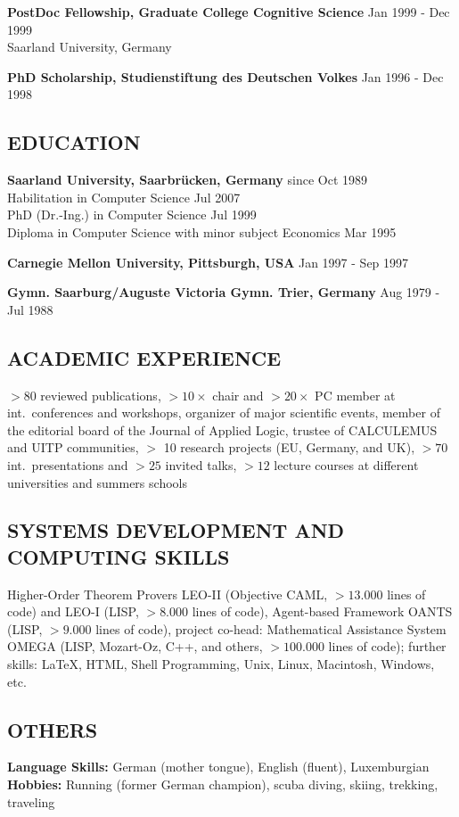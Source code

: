 \documentclass{article}
\newcommand{\tmtextbf}[1]{{\bfseries{#1}}}
\begin{document}
{\noindent}\tmtextbf{PostDoc Fellowship, Graduate College Cognitive Science}
{\hspace*{\fill}}Jan 1999 - Dec 1999\\
Saarland University, Germany

{\noindent}\tmtextbf{PhD Scholarship, Studienstiftung des Deutschen Volkes}
{\hspace*{\fill}}Jan 1996 - Dec 1998

\subsection*{EDUCATION}{\noindent}\tmtextbf{Saarland University,
Saarbr\"ucken, Germany} {\hspace*{\fill}}since Oct 1989\\
Habilitation in Computer Science {\hspace*{\fill}}Jul 2007\\
PhD (Dr.-Ing.) in Computer Science {\hspace*{\fill}}Jul 1999\\
Diploma in Computer Science with minor subject Economics {\hspace*{\fill}}Mar
1995

{\noindent}\tmtextbf{Carnegie Mellon University, Pittsburgh, USA}
{\hspace*{\fill}}Jan 1997 - Sep 1997

{\noindent}\tmtextbf{Gymn. Saarburg/Auguste Victoria Gymn. Trier, Germany}
{\hspace*{\fill}}Aug 1979 - Jul 1988

\subsection*{ACADEMIC EXPERIENCE}{\noindent}$> 80$ reviewed publications, $>
10 \times$ chair and $> 20 \times$ PC member at int.~conferences and
workshops, organizer of major scientific events, member of the editorial board
of the Journal of Applied Logic, trustee of CALCULEMUS and UITP communities,
$>$ 10 research projects (EU, Germany, and UK), $> 70$ int.~presentations and
$> 25$ invited talks, $> 12$ lecture courses at different universities and
summers schools

\subsection*{SYSTEMS DEVELOPMENT AND COMPUTING SKILLS} Higher-Order Theorem
Provers LEO-II (Objective CAML, $> 13.000$ lines of code) and LEO-I (LISP, $>
8.000$ lines of code), Agent-based Framework OANTS (LISP, $> 9.000$ lines of
code), project co-head: Mathematical Assistance System OMEGA (LISP, Mozart-Oz,
C++, and others, $> 100.000$ lines of code); further skills: LaTeX, HTML,
Shell Programming, Unix, Linux, Macintosh, Windows, etc.

\subsection*{OTHERS}{\noindent}\tmtextbf{Language Skills:} German (mother
tongue), English (fluent), Luxemburgian\\
{\noindent}\tmtextbf{Hobbies:} Running (former German champion), scuba diving,
skiing, trekking, traveling

{\vspace{1cm}}
\end{document}

